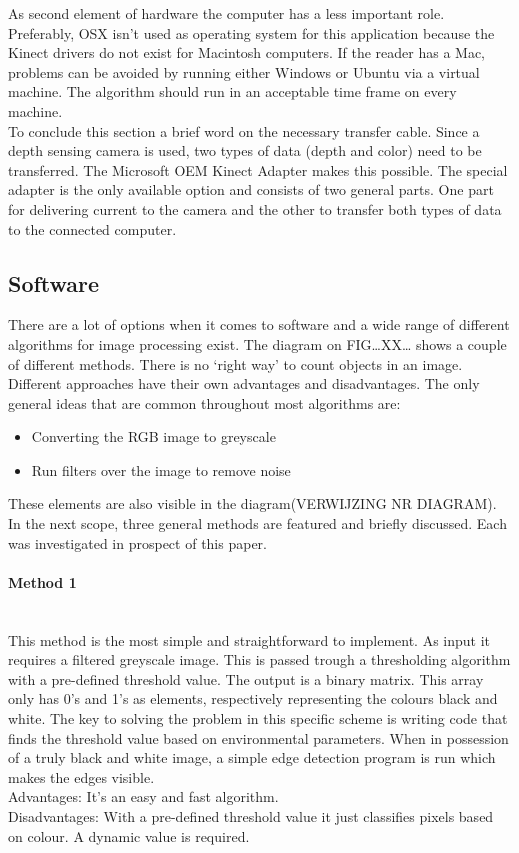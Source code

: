 \documentclass[11pt]{article}
\begin{document}
As second element of hardware the computer has a less important role. Preferably, OSX isn't used as operating system for this application because the Kinect drivers do not exist for Macintosh computers. If the reader has a Mac, problems can be avoided by running either Windows or Ubuntu via a virtual machine. The algorithm should run in an acceptable time frame on every machine.\\
To conclude this section a brief word on the necessary transfer cable. Since a depth sensing camera is used, two types of data (depth and color) need to be transferred. The Microsoft OEM Kinect Adapter makes this possible. The special adapter is the only available option and consists of two general parts. One part for delivering current to the camera and the other to transfer both types of data to the connected computer.


\subsection{Software}
There are a lot of options when it comes to software and a wide range of different algorithms for image processing exist. The diagram on FIG…XX… shows a couple of different methods. There is no ‘right way’ to count objects in an image. Different approaches have their own advantages and disadvantages. The only general ideas that are common throughout most algorithms are:
\begin{itemize}
\item Converting the RGB image to greyscale
\item Run filters over the image to remove noise
\end{itemize}
These elements are also visible in the diagram(VERWIJZING NR DIAGRAM). In the next scope, three general methods are featured and briefly discussed. Each was investigated in prospect of this paper. 
\paragraph{Method 1}\mbox{}\\
This method is the most simple and straightforward to implement. As input it requires a filtered greyscale image. This is passed trough a thresholding algorithm with a pre-defined threshold value. The output is a binary matrix. This array only has 0's and 1's as elements, respectively representing the colours black and white. The key to solving the problem in this specific scheme is writing code that finds the threshold value based on environmental parameters. When in possession of a truly black and white image, a simple edge detection program is run which makes the edges visible.
\\Advantages: It’s an easy and fast algorithm.
\\Disadvantages: With a pre-defined threshold value it just classifies pixels based on colour. A dynamic value is required.
\end{document}
